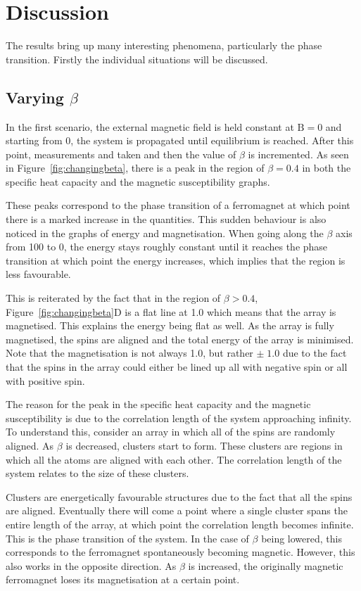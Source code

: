 \documentclass[11pt]{article}
\newcommand{\mathbold}[1]{\boldsymbol{\mathrm{#1}}}
\begin{document}
\section*{Discussion}
The results bring up many interesting phenomena, particularly the phase transition. Firstly the individual situations will be discussed.

\subsection*{Varying $\beta$}
In the first scenario, the external magnetic field is held constant at $\mathbold{B}=0$ and starting from 0, the system is propagated until equilibrium is reached. After this point, measurements and taken and then the value of $\beta$ is incremented. As seen in Figure~\ref{fig:changingbeta}, there is a peak in the region of $\beta=0.4$ in both the specific heat capacity and the magnetic susceptibility graphs.

These peaks correspond to the phase transition of a ferromagnet at which point there is a marked increase in the quantities. This sudden behaviour is also noticed in the graphs of energy and magnetisation. When going along the $\beta$ axis from 100 to 0, the energy stays roughly constant until it reaches the phase transition at which point the energy increases, which implies that the region is less favourable.

This is reiterated by the fact that in the region of $\beta>0.4$, Figure~\ref{fig:changingbeta}D is a flat line at 1.0 which means that the array is magnetised. This explains the energy being flat as well. As the array is fully magnetised, the spins are aligned and the total energy of the array is minimised. Note that the magnetisation is not always 1.0, but rather $\pm\;1.0$ due to the fact that the spins in the array could either be lined up all with negative spin or all with positive spin.

The reason for the peak in the specific heat capacity and the magnetic susceptibility is due to the correlation length of the system approaching infinity. To understand this, consider an array in which all of the spins are randomly aligned. As $\beta$ is decreased, clusters start to form. These clusters are regions in which all the atoms are aligned with each other. The correlation length of the system relates to the size of these clusters\cite{kim}.

Clusters are energetically favourable structures due to the fact that all the spins are aligned. Eventually there will come a point where a single cluster spans the entire length of the array, at which point the correlation length becomes infinite. This is the phase transition of the system. In the case of $\beta$ being lowered, this corresponds to the ferromagnet spontaneously becoming magnetic. However, this also works in the opposite direction. As $\beta$ is increased, the originally magnetic ferromagnet loses its magnetisation at a certain point.
\end{document}
